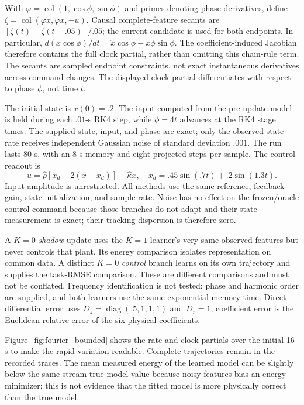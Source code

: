 \documentclass[journal]{IEEEtran}
\newcommand{\col}{\operatorname{col}}
\begin{document}
With $\varphi=\col(1,\cos\phi,\sin\phi)$ and primes denoting
phase derivatives, define $\zeta=\col(\varphi\dot x,\varphi x,-u)$.
Causal complete-feature secants are
$[\zeta(t)-\zeta(t-.05)]/.05$; the current candidate is used for both
endpoints. In particular,
$d(\dot x\cos\phi)/dt=\ddot x\cos\phi-\dot x\dot\phi\sin\phi$.
The coefficient-induced Jacobian therefore contains the full clock partial, rather than
omitting this chain-rule term. The secants are sampled endpoint constraints,
not exact instantaneous derivatives across command changes. The displayed
clock partial differentiates with respect to phase $\phi$, not time $t$.

The initial state is $x(0)=.2$. The input computed from the pre-update model
is held during each $.01$-s RK4 step, while $\phi=4t$ advances at the RK4
stage times. The supplied state, input, and phase are exact; only the observed
state rate receives independent Gaussian noise of standard deviation $.001$.
The run lasts 80 s, with an 8-s memory and eight projected steps per sample.
The control readout is
\begin{equation}
 u=\widehat\rho[\dot x_d-2(x-x_d)]+\widehat\kappa x,
 \quad x_d=.45\sin(.7t)+.2\sin(1.3t).
 \label{eq:fourier_control}
\end{equation}
Input amplitude is unrestricted. All methods use the same reference,
feedback gain, state initialization, and sample rate. Noise has no effect on
the frozen/oracle control command because those branches do not adapt and
their state measurement is exact; their tracking dispersion is therefore zero.

A $K=0$ \emph{shadow} update uses the $K=1$ learner's very same observed
features but never controls that plant. Its energy comparison isolates
representation on common data. A distinct $K=0$ \emph{control} branch
learns on its own trajectory and supplies the task-RMSE comparison. These
are different comparisons and must not be conflated. Frequency
identification is not tested: phase and harmonic order are
supplied, and both learners use the same exponential memory time. Direct differential
error uses $D_z=\operatorname{diag}(.5,1,1,1)$ and $D_r=1$; coefficient
error is the Euclidean relative error of the six physical coefficients.

Figure~\ref{fig:fourier_bounded} shows the rate and clock partials over the initial 16 s to
make the rapid variation readable. Complete trajectories remain in the
recorded traces. The mean measured energy of the learned model can be
slightly below the same-stream true-model value because noisy features bias
an energy minimizer; this is not evidence that the fitted model is more
physically correct than the true model.
\end{document}
